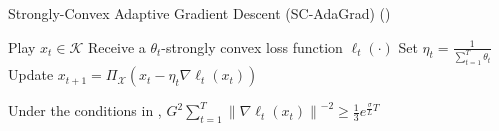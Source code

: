 \documentclass[pmlr]{jmlr} %
\def\K{\mathcal{K}}
\newcommand{\norm}[1]{\left\lVert#1\right\rVert}
\newcommand{\norme}[1]{\norm{#1}}
\newcommand{\XX}{\mathcal{X}}
\begin{document}
\begin{algorithm}[h] 
  \caption{Strongly-Convex Adaptive Gradient Descent (SC-AdaGrad) (\cite{L17})}
  \label{alg:SC-AdaNGD}
  \begin{algorithmic}[1]
    \STATE Play $x_{t} \in \K$
    \STATE Receive a $\theta_{t}$-strongly convex loss function $\ell_{t}(\cdot)$
    \STATE Set $\eta_{t} = \frac{1}{\sum_{t=1}^{T} \theta_{t}}$
    \STATE Update $x_{t+1} = \Pi_{\XX} (x_{t} - \eta_{t} \nabla \ell_{t}(x_{t}))$  
    \ENDFOR
  \end{algorithmic}
\end{algorithm}

\begin{lemma} 
Under the conditions in ,
$G^{2} \sum_{t=1}^{T} \norme{\nabla \ell_{t}(x_{t})}^{-2} \ge \frac{1}{3}e^{\frac{\sigma}{L}T}$
\end{lemma}
\end{document}
